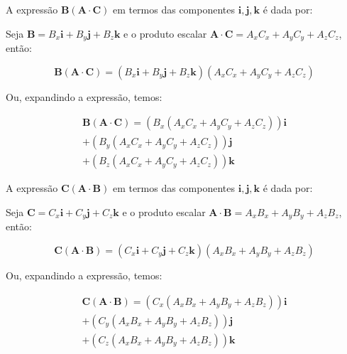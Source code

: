 \documentclass[a4paper,12pt]{article}
\begin{document}
A expressão \( \mathbf{B}(\mathbf{A} \cdot \mathbf{C}) \) em termos das componentes \( \mathbf{i}, \mathbf{j}, \mathbf{k} \) é dada por:

Seja \( \mathbf{B} = B_x \mathbf{i} + B_y \mathbf{j} + B_z \mathbf{k} \) e o produto escalar \( \mathbf{A} \cdot \mathbf{C} = A_x C_x + A_y C_y + A_z C_z \), então:

\begin{equation}
\mathbf{B} (\mathbf{A} \cdot \mathbf{C}) = (B_x \mathbf{i} + B_y \mathbf{j} + B_z \mathbf{k}) (A_x C_x + A_y C_y + A_z C_z)
\end{equation}

Ou, expandindo a expressão, temos:

\begin{equation}
    \begin{aligned}
\mathbf{B} (\mathbf{A} \cdot \mathbf{C}) = \left( B_x (A_x C_x + A_y C_y + A_z C_z) \right) \mathbf{i}\\
             + \left( B_y (A_x C_x + A_y C_y + A_z C_z) \right) \mathbf{j}\\
             + \left( B_z (A_x C_x + A_y C_y + A_z C_z) \right) \mathbf{k}
\end{aligned}
\end{equation}

A expressão \( \mathbf{C}(\mathbf{A} \cdot \mathbf{B}) \) em termos das componentes \( \mathbf{i}, \mathbf{j}, \mathbf{k} \) é dada por:

Seja \( \mathbf{C} = C_x \mathbf{i} + C_y \mathbf{j} + C_z \mathbf{k} \) e o produto escalar \( \mathbf{A} \cdot \mathbf{B} = A_x B_x + A_y B_y + A_z B_z \), então:

\begin{equation}
\mathbf{C} (\mathbf{A} \cdot \mathbf{B}) = (C_x \mathbf{i} + C_y \mathbf{j} + C_z \mathbf{k}) (A_x B_x + A_y B_y + A_z B_z)
\end{equation}

Ou, expandindo a expressão, temos:

\begin{equation}
    \begin{aligned}
\mathbf{C} (\mathbf{A} \cdot \mathbf{B}) = \left( C_x (A_x B_x + A_y B_y + A_z B_z) \right) \mathbf{i}\\
        + \left( C_y (A_x B_x + A_y B_y + A_z B_z) \right) \mathbf{j} \\
        + \left( C_z (A_x B_x + A_y B_y + A_z B_z) \right) \mathbf{k}
\end{aligned}
\end{equation}
\end{document}

